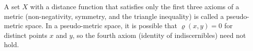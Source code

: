 A set $X$ with a distance function that satisfies only the first three axioms of a metric (non-negativity, symmetry, and the triangle inequality) is called a pseudo-metric space. In a pseudo-metric space, it is possible that $\varrho(x, y) = 0$ for distinct points $x$ and $y$, so the fourth axiom (identity of indiscernibles) need not hold.
